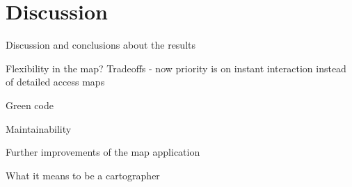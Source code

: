 \section{Discussion}

Discussion and conclusions about the results

Flexibility in the map? Tradeoffs - now priority is on instant interaction instead of detailed access maps

Green code

Maintainability

Further improvements of the map application

What it means to be a cartographer

